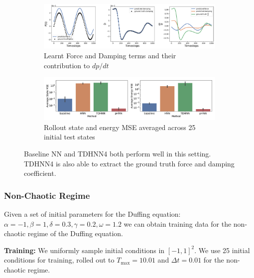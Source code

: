 \documentclass[twoside]{article}
\begin{document}
\begin{figure}[h!]
\centering
\captionsetup{justification=centering}
	\begin{subfigure}[b]{0.48\textwidth}
		\centering
		\includegraphics[width=\textwidth]{figures/figures/duffing/1/duffing_dpdt_0.pdf}
		\caption{Learnt Force and Damping terms and their contribution to $dp/dt$}
	\end{subfigure}
	\begin{subfigure}[b]{0.48\textwidth}
	    \centering
		\includegraphics[width=\textwidth]{figures/figures/duffing/1/duffing_errors_0.pdf}
		\caption{Rollout state and energy MSE averaged across 25 initial test states}
	\end{subfigure}
\caption{Baseline NN and TDHNN4 both perform well in this setting. TDHNN4 is also able to extract the ground truth force and damping coefficient.}
\label{fig.duffing}
\end{figure}

\subsubsection{Non-Chaotic Regime}

Given a set of initial parameters for the Duffing equation: $\alpha =-1,\beta=1,\delta=0.3,\gamma=0.2,\omega=1.2$ we can obtain training data for the non-chaotic regime of the Duffing equation. 

\textbf{Training:} We uniformly sample initial conditions in $[-1,1]^2$. We use 25 initial conditions for training, rolled out to $T_{\max}=10.01$ and $\Delta t =0.01$ for the non-chaotic regime. 
\end{document}
